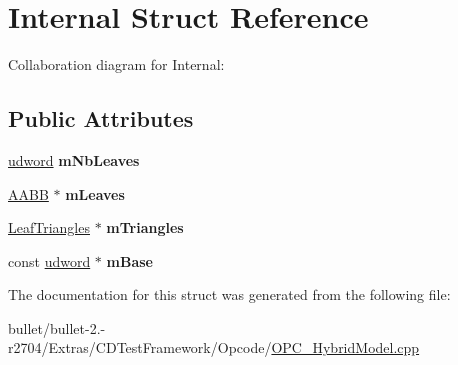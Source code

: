 \hypertarget{struct_internal}{\section{Internal Struct Reference}
\label{struct_internal}
}


Collaboration diagram for Internal\+:
\subsection*{Public Attributes}
\begin{DoxyCompactItemize}
\item 
\hypertarget{struct_internal_ae08a85cf155ad3dd57c794fba1d93c99}{\hyperlink{_ice_types_8h_a44c6f1920ba5551225fb534f9d1a1733}{udword} {\bfseries m\+Nb\+Leaves}}\label{struct_internal_ae08a85cf155ad3dd57c794fba1d93c99}

\item 
\hypertarget{struct_internal_a1a3361062b61398a936a0b8522ec5efb}{\hyperlink{class_a_a_b_b}{A\+A\+B\+B} $\ast$ {\bfseries m\+Leaves}}\label{struct_internal_a1a3361062b61398a936a0b8522ec5efb}

\item 
\hypertarget{struct_internal_a5ccf577e118013669dabe5c378035185}{\hyperlink{struct_leaf_triangles}{Leaf\+Triangles} $\ast$ {\bfseries m\+Triangles}}\label{struct_internal_a5ccf577e118013669dabe5c378035185}

\item 
\hypertarget{struct_internal_a5a429590ff1aa3b803deb98bc2ccb6ce}{const \hyperlink{_ice_types_8h_a44c6f1920ba5551225fb534f9d1a1733}{udword} $\ast$ {\bfseries m\+Base}}\label{struct_internal_a5a429590ff1aa3b803deb98bc2ccb6ce}

\end{DoxyCompactItemize}


The documentation for this struct was generated from the following file\+:\begin{DoxyCompactItemize}
\item 
bullet/bullet-\/2.-\/r2704/\+Extras/\+C\+D\+Test\+Framework/\+Opcode/\hyperlink{_o_p_c___hybrid_model_8cpp}{O\+P\+C\+\_\+\+Hybrid\+Model.\+cpp}\end{DoxyCompactItemize}
